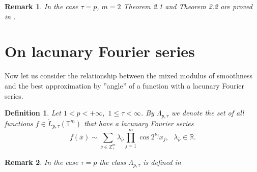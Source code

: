 \documentclass[12pt]{article}
\def\leq {\leqslant}
\theoremstyle{plain}
\newtheorem{rem}{Remark}[section]
\newtheorem{op}{Definition}[section]
\begin{document}
\begin{rem}\label{rem2.4} In the case $\tau=p$, $m=2$ Theorem 2.1 and Theorem 2.2 are proved in \cite{17}.
\end{rem} 


\setcounter{equation}{0}
\setcounter{lemma}{0}
\setcounter{theorem}{0}


\section{On lacunary Fourier series}\label{sec3}

 Now let us consider the relationship between the mixed modulus of smoothness and the best approximation by ''angle'' of a function with a lacunary Fourier series.

\begin{op}\label{def6}  Let  
$1 < p < +\infty,$ $1\leq \tau< \infty$. By $\Lambda_{p ,\tau}$ we denote the set of all functions $f\in {\mathring L}_{p, \tau} (\mathbb{T}^{m})$ that have a lacunary Fourier series 
\begin{equation*} 
f(\overline{x}) \sim \sum_{\overline{\nu} \in \mathbb{Z}_{+}^{m}}\lambda_{\overline{\nu}} \prod_{j=1}^{m}\cos 2^{\nu_{j}}x_{j}, \,\, \, \, \lambda_{\overline{\nu}}\in \mathbb{R}.
\end{equation*}
\end{op}
\begin{rem}\label{rem3.1} In the case $\tau = p$ the class $\Lambda_{p ,\tau}$ is defined in \cite{17}
\end{rem}
\end{document}
